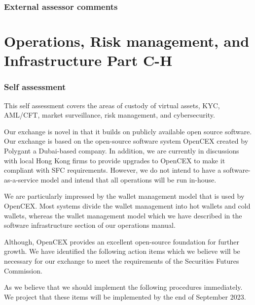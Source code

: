 \documentclass[]{report}
\begin{document}
\subsection{External assessor comments}

\chapter{Operations, Risk management, and Infrastructure Part C-H}

\subsection{Self assessment}

This self assessment covers the areas of custody of virtual assets,
KYC, AML/CFT, market surveillance, risk management, and cybersecurity.

Our exchange is novel in that it builds on publicly available open
source software.  Our exchange is based on the open-source software
system OpenCEX created by Polygant a Dubai-based company.  In addition,
we are currently in discussions with local Hong Kong firms to provide
upgrades to OpenCEX to make it compliant with SFC requirements.
However, we do not intend to have a software-as-a-service model and
intend that all operations will be run in-house.

We are particularly impressed by the wallet management model that is
used by OpenCEX.  Most systems divide the wallet management into hot
wallets and cold wallets, whereas the wallet management model which we
have described in the software infrastructure section of our
operations manual.

Although, OpenCEX provides an excellent open-source foundation for
further growth.  We have identified the following action items which
we believe will be necessary for our exchange to meet the requirements
of the Securities Futures Commission.

As we believe that we should implement the following procedures
immediately.  We project that these items will be implemented by the
end of September 2023.
\end{document}

